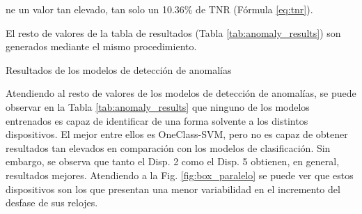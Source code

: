 ne un valor tan elevado, tan solo un 10.36\% de TNR (Fórmula \ref{eq:tnr}).

\begin{table}[htpb!]
    \centering
     \qquad
    \caption{Matrices de confusión del Disp. 1 con el modelo de Isolation Forest}
    \label{tab:ex_unsupervised_results}
\end{table}

El resto de valores de la tabla de resultados (Tabla \ref{tab:anomaly_results}) son generados mediante el mismo procedimiento.

\begin{table}[htpb!]
    \centering
    
    \caption{Resultados de los modelos de detección de anomalías}
    \label{tab:anomaly_results}
\end{table}

Atendiendo al resto de valores de los modelos de detección de anomalías, se puede observar en la Tabla \ref{tab:anomaly_results} que ninguno de los modelos entrenados es capaz de identificar de una forma solvente a los distintos dispositivos. El mejor entre ellos es OneClass-SVM, pero no es capaz de obtener resultados tan elevados en comparación con los modelos de clasificación. Sin embargo, se observa que tanto el Disp. 2 como el Disp. 5 obtienen, en general, resultados mejores. Atendiendo a la Fig. \ref{fig:box_paralelo} se puede ver que estos dispositivos son los que presentan una menor variabilidad en el incremento del desfase de sus relojes.

